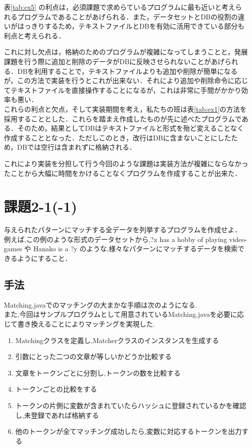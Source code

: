 \documentclass[12pt]{jarticle}
\begin{document}
表\ref{tab:ex5} の利点は，必須課題で求めらているプログラムに最も近いと考えられるプログラムであることがあげられる．また，データセットとDBの役割の違いがはっきりするため，テキストファイルとDBを有効に活用できている部分も利点と考えられる．\par
これに対し欠点は，格納のためのプログラムが複雑になってしまうことと，発展課題を行う際に追加と削除のデータがDBに反映させられないことがあげられる．DBを利用することで，テキストファイルよりも追加や削除が簡単になるが，この方法で実装を行うとこれが出来ない．それにより追加や削除命令に応じてテキストファイルを直接操作することになるが，これは非常に手間がかかり効率も悪い．\\

これらの利点と欠点，そして実装期間を考え，私たちの班は表\ref{tab:ex1}の方法を採用することとした．これらを踏まえ作成したものが先に述べたプログラムである．そのため，結果としてDBはテキストファイルと形式を殆ど変えることなく作成することとなった．ただしこのとき，改行はDBに含まないことにしたため，DBでは空行は含まれずに格納される．\par
これにより実装を分担して行う今回のような課題は実装方法が複雑にならなかったことから大幅に時間をかけることなくプログラムを作成することが出来た．\\



\section{課題2-1(-1)}
\begin{screen}
与えられたパターンにマッチする全データを列挙するプログラムを作成せよ．\\
例えば,この例のような形式のデータセットから,?x has a hobby of playing video-games や Hanako is a ?y のような,様々なパターンにマッチするデータを検索できるようにすること．
\end{screen}

\subsection{手法}
Matching.javaでのマッチングの大まかな手順は次のようになる.\\
また,今回はサンプルプログラムとして用意されているMatching.javaを必要に応じて書き換えることによりマッチングを実現した.

\begin{enumerate}
\item Matchingクラスを定義し,Matcherクラスのインスタンスを生成する
\item 引数にとった二つの文章が等しいかどうか比較する
\item 文章をトークンごとに分割し,トークンの数を比較する
\item トークンごとの比較をする
\item トークンの片側に変数が含まれていたらハッシュに登録されているかを確認し,未登録であれば格納する
\item 他のトークンが全てマッチング成功したら,変数に対応するトークンを出力する
\end{enumerate}
\end{document}
